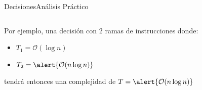 \documentclass[spanish, c]{beamer}
\newcommand{\bigO}{\mathcal{O}}
\begin{document}
\begin{frame}{Decisiones}{Análisis Práctico}
\begin{columns}
\begin{column}{0.65\textwidth}
            \bigskip

            Por ejemplo, una decisión con 2 ramas de instrucciones donde:

            \begin{itemize}
                \item $T_1 = \bigO(\log n)$
                \item $T_2 = \alert{\bigO(n \log n)}$
            \end{itemize}

            \bigskip

            tendrá entonces una complejidad de $T = \alert{\bigO(n \log n)}$
        \end{column}
    \end{columns}
\end{frame}
\end{document}

